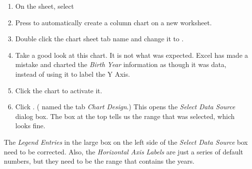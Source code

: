 \begin{enumerate}
	\item On the  sheet, select 
	\item Press  to automatically create a column chart on a new worksheet.
	\item Double click the chart sheet tab name and change it to .
	\item Take a good look at this chart. It is not what was expected. Excel has made a mistake and charted the \textit{Birth Year} information as though it was data, instead of using it to label the Y Axis.
	\item Click the chart to activate it.
	\item Click . ( named the tab \textit{Chart Design}.) This opens the \textit{Select Data Source} dialog box. The box at the top tells us the range that was selected, which looks fine. 
\end{enumerate}
	
The \textit{Legend Entries} in the large box on the left side of the \textit{Select Data Source} box need to be corrected. Also, the \textit{Horizontal Axis Labels} are just a series of default numbers, but they need to be the range that contains the years.

